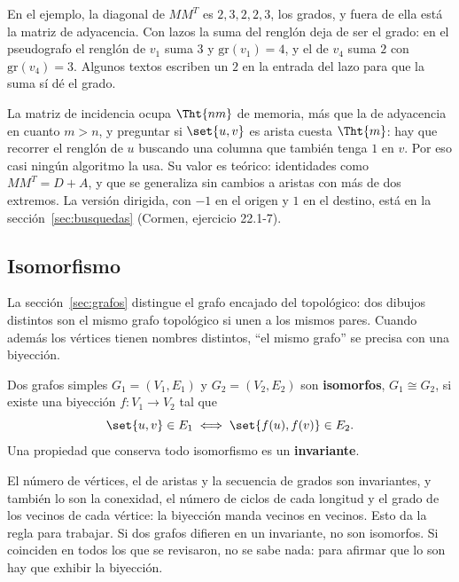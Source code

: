 \documentclass[11pt,letterpaper]{article}
\begin{document}
En el ejemplo, la diagonal de $M M^{T}$ es $2, 3, 2, 2, 3$, los grados,
y fuera de ella está la matriz de adyacencia. Con lazos la suma del
renglón deja de ser el grado: en el pseudografo el renglón de $v_1$
suma $3$ y $\text{gr}(v_1) = 4$, y el de $v_4$ suma $2$ con
$\text{gr}(v_4) = 3$. Algunos textos escriben un $2$ en la entrada del
lazo para que la suma sí dé el grado.

\begin{idea}
  La matriz de incidencia ocupa $\Tht{nm}$ de memoria, más que la de
  adyacencia en cuanto $m > n$, y preguntar si $\set{u, v}$ es arista
  cuesta $\Tht{m}$: hay que recorrer el renglón de $u$ buscando una
  columna que también tenga $1$ en $v$. Por eso casi ningún algoritmo
  la usa. Su valor es teórico: identidades como $M M^{T} = D + A$, y
  que se generaliza sin cambios a aristas con más de dos extremos. La
  versión dirigida, con $-1$ en el origen y $1$ en el destino, está en
  la sección~\ref{sec:busquedas} (Cormen, ejercicio 22.1-7).
\end{idea}


\subsection*{Isomorfismo}

La sección~\ref{sec:grafos} distingue el grafo encajado del
topológico: dos dibujos distintos son el mismo grafo topológico si unen
a los mismos pares. Cuando además los vértices tienen nombres
distintos, ``el mismo grafo'' se precisa con una biyección.

\begin{definicion}[Isomorfismo]
  \label{def:isomorfismo}
  Dos grafos simples $G_1 = (V_1, E_1)$ y $G_2 = (V_2, E_2)$ son
  \textbf{isomorfos}, $G_1 \cong G_2$, si existe una biyección
  $f : V_1 \to V_2$ tal que
  \[
    \set{u, v} \in E_1 \iff \set{f(u), f(v)} \in E_2 .
  \]
  Una propiedad que conserva todo isomorfismo es un
  \textbf{invariante}.
\end{definicion}

El número de vértices, el de aristas y la secuencia de grados son
invariantes, y también lo son la conexidad, el número de ciclos de
cada longitud y el grado de los vecinos de cada vértice: la biyección
manda vecinos en vecinos. Esto da la regla para trabajar. Si dos grafos
difieren en un invariante, no son isomorfos. Si coinciden en todos los
que se revisaron, no se sabe nada: para afirmar que lo son hay que
exhibir la biyección.
\end{document}
